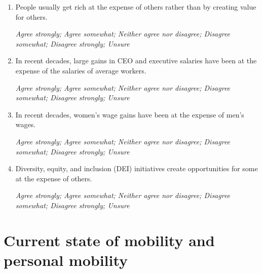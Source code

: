\documentclass[11pt, headsepline]{article}
\begin{document}
\begin{enumerate}[resume]


    \item People usually get rich at the expense of others rather than by creating value for others.

    \textit{Agree strongly; Agree somewhat; Neither agree nor disagree; Disagree somewhat; Disagree strongly; Unsure}

    \item In recent decades, large gains in CEO and executive salaries have been at the expense of the salaries of average workers.

    \textit{Agree strongly; Agree somewhat; Neither agree nor disagree; Disagree somewhat; Disagree strongly; Unsure}

    \item In recent decades, women’s wage gains have been at the expense of men’s wages.

    \textit{Agree strongly; Agree somewhat; Neither agree nor disagree; Disagree somewhat; Disagree strongly; Unsure}

    \item Diversity, equity, and inclusion (DEI) initiatives create opportunities for some at the expense of others.

    \textit{Agree strongly; Agree somewhat; Neither agree nor disagree; Disagree somewhat; Disagree strongly; Unsure}
    
\end{enumerate}

\section*{Current state of mobility and personal mobility}
\end{document}
